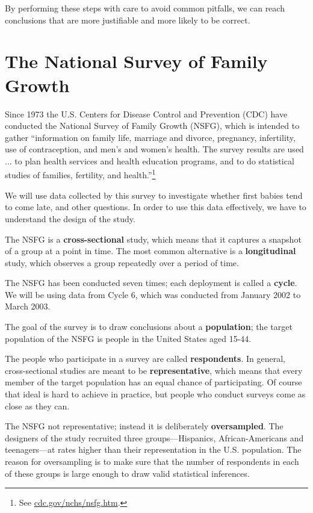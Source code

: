 \documentclass[12pt]{book}
\begin{document}
By performing these steps with care to avoid common pitfalls, we can
reach conclusions that are more justifiable and more likely to be
correct.


\section{The National Survey of Family Growth}
\label{nsfg}

Since 1973 the U.S. Centers for Disease Control and Prevention (CDC)
have conducted the National Survey of Family Growth (NSFG),
which is intended to gather ``information on family life, marriage and
divorce, pregnancy, infertility, use of contraception, and men's and
women's health. The survey results are used ... to plan health services and
health education programs, and to do statistical studies of families,
fertility, and health.''\footnote{See
  \url{cdc.gov/nchs/nsfg.htm}.}

We will use data collected by this survey to investigate whether first
babies tend to come late, and other questions.  In order to use this
data effectively, we have to understand the design of the study.

The NSFG is a {\bf cross-sectional} study, which means that it
captures a snapshot of a group at a point in time.  The most
common alternative is a {\bf longitudinal} study, which observes a
group repeatedly over a period of time.

The NSFG has been conducted seven times; each deployment is called
a {\bf cycle}.  We will be using data from Cycle 6, which was
conducted from January 2002 to March 2003.

The goal of the survey is to draw conclusions about a
{\bf population}; the target population of the NSFG is people in
the United States aged 15-44.

The people who participate in a survey are called {\bf respondents}.
In general, cross-sectional studies are meant to be {\bf
  representative}, which means that every member of the target
population has an equal chance of participating.  Of course that ideal
is hard to achieve in practice, but people who conduct surveys come as
close as they can.

The NSFG not representative; instead it is deliberately {\bf
  oversampled}.  The designers of the study recruited three
groups---Hispanics, African-Americans and teenagers---at rates higher
than their representation in the U.S. population.
The reason for oversampling is to make sure that the number of
respondents in each of these groups is large enough to draw valid
statistical inferences.
\end{document}
